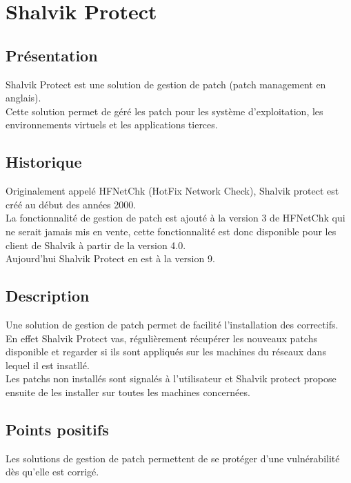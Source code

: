 \section{Shalvik Protect}
\thispagestyle{plain}
\subsection{Présentation}
Shalvik Protect est une solution de gestion de patch (patch management en anglais).\\
Cette solution permet de géré les patch pour les système d’exploitation, les environnements virtuels et les applications tierces.\\

\subsection{Historique}
Originalement appelé HFNetChk (HotFix Network Check), Shalvik protect est créé au début des années 2000.\\
La fonctionnalité de gestion de patch est ajouté à la version 3 de HFNetChk qui ne serait jamais mis en vente, cette fonctionnalité est donc disponible pour les client de Shalvik à partir de la version 4.0.\\
Aujourd’hui Shalvik Protect en est à la version 9.\\

\subsection{Description}
Une solution de gestion de patch permet de facilité l’installation des correctifs.\\

En effet Shalvik Protect vas, régulièrement récupérer les nouveaux patchs disponible et regarder si ils sont appliqués sur les machines du réseaux dans lequel il est insatllé.\\

Les patchs  non installés sont signalés à l’utilisateur et Shalvik protect propose ensuite de les installer sur toutes les machines concernées.\\


\subsection{Points positifs}
Les solutions de gestion de patch permettent de se protéger d’une vulnérabilité dès qu’elle est corrigé.\\

